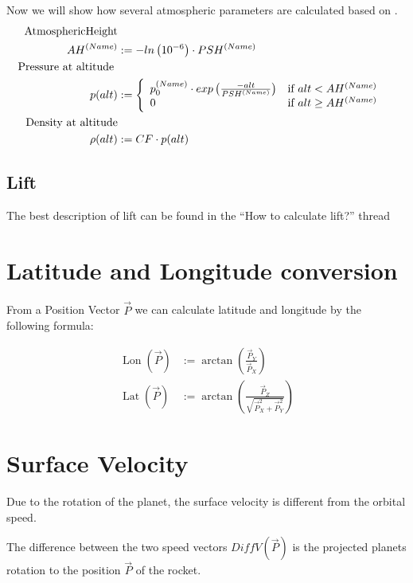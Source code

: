 \documentclass[11pt]{report}
\newcommand{\oa}[1]{\overrightarrow{#1}}
\newcommand{\Pos}{\oa{P}}
\DeclareMathOperator{\Lat}{Lat}
\DeclareMathOperator{\Lon}{Lon}
\begin{document}
Now we will show how several atmospheric parameters are calculated
based on \cite{Atmo}.
\begin{align}
  \index{Atmospheric Height} \textrm{AtmosphericHeight}\nonumber\\
  AH^{(Name)} &:= -ln\left(10^{-6}\right)\cdot PSH^{(Name)}\\
  \index{Pressure} \textrm{Pressure at altitude }&\nonumber\\
  p(alt) &:=
  \left\{
      \begin{array}{l l}
        p_0^{(Name)} \cdot exp\left({\frac{-alt}{PSH^{(Name)}}}\right) & \textrm{if } alt < AH^{(Name)}\\
        0 &\textrm{if } alt \geq AH^{(Name)}
      \end{array}
    \right.\\
    \index{Density} \textrm{Density at altitude}\nonumber\\
    \rho(alt) &:= CF \cdot p(alt)
\end{align}


\section{Lift}

The best description of  lift can be found in the ``How to
calculate lift?'' thread \cite{Lift}

\chapter{Latitude and Longitude conversion}

From a Position Vector $\Pos$ we can calculate 
latitude and  longitude by the following formula:

\begin{align}
  \Lon(\Pos) &:= \arctan\left(\frac{\Pos_Y}{\Pos_X}\right)\\
  \Lat(\Pos) &:= \arctan\left(\frac{\Pos_Z}{\sqrt{\Pos_X^2+\Pos_Y^2}}\right)
\end{align}

\chapter{Surface Velocity}

Due to the rotation of the planet, the 
surface velocity is different from the orbital speed.

The difference between the two speed vectors $DiffV(\Pos)$ is the
projected planets rotation to the position $\Pos$ of the rocket.
\end{document}
